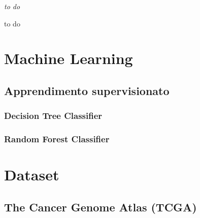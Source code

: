 \documentclass[12pt,italian]{report}
\begin{document}
	
	\frontespizio
	\beforepreface
	
	
	{\raggedleft \large \sl to do\\
		
	}
	
	
	
	
	
	
	
	to do
	
	
	\afterpreface
	
	
	\chapter{Machine Learning}
	
	\section{Apprendimento supervisionato}
	\subsection{Decision Tree Classifier}
	\subsection{Random Forest Classifier}
	
	\chapter{Dataset}
	\section{The Cancer Genome Atlas (TCGA)}
	
\end{document}

